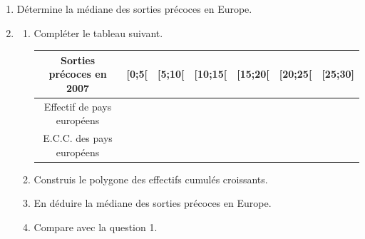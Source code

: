 \begin{enumerate}
\item Détermine la médiane des sorties précoces en Europe. 

\item 
\begin{enumerate}
\item Compléter le tableau suivant.

\begin{tabular}{|c|c|c|c|c|c|c|}
\hline 
Sorties précoces en 2007 & [0;5[ & [5;10[ & [10;15[ & [15;20[ & [20;25[ & [25;30] \\ 
\hline 
Effectif de pays européens &  &  &  &  &  &  \\ 
\hline 
E.C.C. des pays européens &  &  &  &  &  &  \\ 
\hline 
\end{tabular} 

\item Construis le polygone des effectifs cumulés croissants.

\item En déduire la médiane des sorties précoces en Europe. 
 
\item Compare avec la question 1.
\end{enumerate}
\end{enumerate}



  